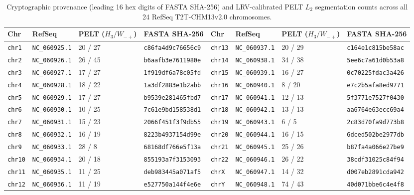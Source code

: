 \documentclass[11pt,a4paper]{article}
\newcommand{\Wmp}{W_{-+}}
\begin{document}
\begin{table}[htbp]
\centering
\caption{Cryptographic provenance (leading 16 hex digits of FASTA SHA-256) and LRV-calibrated PELT $L_2$ segmentation counts across all 24 RefSeq T2T-CHM13v2.0 chromosomes.}
\label{tab:sha}
\scriptsize
\setlength{\tabcolsep}{5.0pt}
\begin{tabular}{@{}llll|llll@{}}
\toprule
\textbf{Chr} & \textbf{RefSeq} & \textbf{PELT ($H_3/\Wmp$)} & \textbf{FASTA SHA-256} & \textbf{Chr} & \textbf{RefSeq} & \textbf{PELT ($H_3/\Wmp$)} & \textbf{FASTA SHA-256} \\
\midrule
\texttt{chr1}  & \texttt{NC\_060925.1} & 20 / 27 & \texttt{c86fa4d9c76656c9} & \texttt{chr13} & \texttt{NC\_060937.1} & 20 / 29 & \texttt{c164e1c815be58ac} \\
\texttt{chr2}  & \texttt{NC\_060926.1} & 26 / 45 & \texttt{b6aafb3e7611980e} & \texttt{chr14} & \texttt{NC\_060938.1} & 34 / 38 & \texttt{5ee6c7a61d0b53a8} \\
\texttt{chr3}  & \texttt{NC\_060927.1} & 17 / 27 & \texttt{1f919df6a78c05fd} & \texttt{chr15} & \texttt{NC\_060939.1} & 16 / 27 & \texttt{0c70225fdac3a426} \\
\texttt{chr4}  & \texttt{NC\_060928.1} & 18 / 22 & \texttt{1a3df2883e1b2abb} & \texttt{chr16} & \texttt{NC\_060940.1} &  8 / 20 & \texttt{e7c2b5afa8ed9771} \\
\texttt{chr5}  & \texttt{NC\_060929.1} & 17 / 27 & \texttt{b9539e281465fbd7} & \texttt{chr17} & \texttt{NC\_060941.1} & 12 / 13 & \texttt{5f3771e7527f0430} \\
\texttt{chr6}  & \texttt{NC\_060930.1} & 10 / 25 & \texttt{7c61e9bd158538d1} & \texttt{chr18} & \texttt{NC\_060942.1} & 13 / 13 & \texttt{aa6764e63ecc69a4} \\
\texttt{chr7}  & \texttt{NC\_060931.1} & 15 / 23 & \texttt{2066f451f3f9db55} & \texttt{chr19} & \texttt{NC\_060943.1} &  6 /  5 & \texttt{2c83d70fa9d773b8} \\
\texttt{chr8}  & \texttt{NC\_060932.1} & 16 / 19 & \texttt{8223b4937154d99e} & \texttt{chr20} & \texttt{NC\_060944.1} & 16 / 15 & \texttt{6dced502be2977db} \\
\texttt{chr9}  & \texttt{NC\_060933.1} & 28 /  8 & \texttt{68168df766e5f13a} & \texttt{chr21} & \texttt{NC\_060945.1} & 25 / 26 & \texttt{b87fa4a066e27be9} \\
\texttt{chr10} & \texttt{NC\_060934.1} & 20 / 18 & \texttt{855193a7f3153093} & \texttt{chr22} & \texttt{NC\_060946.1} & 26 / 22 & \texttt{38cdf31025c84f94} \\
\texttt{chr11} & \texttt{NC\_060935.1} & 11 / 25 & \texttt{deb983445a071af5} & \texttt{chrX}  & \texttt{NC\_060947.1} & 14 / 32 & \texttt{d007eb2891cda942} \\
\texttt{chr12} & \texttt{NC\_060936.1} & 11 / 19 & \texttt{e527750a144f4e6e} & \texttt{chrY}  & \texttt{NC\_060948.1} & 74 / 43 & \texttt{40d071bbe6c4e4f8} \\
\bottomrule
\end{tabular}
\end{table}
\end{document}
